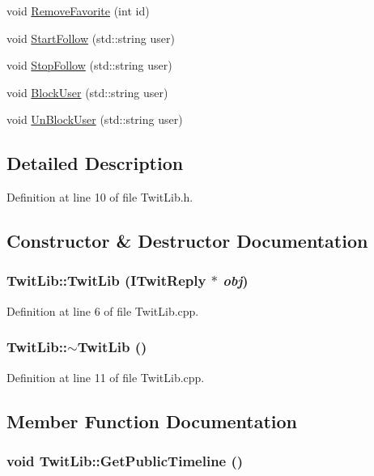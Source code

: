 \begin{CompactItemize}
\item 
void \hyperlink{classTwitLib_3cfdb83433fe9e5675bac209a6db01c6}{RemoveFavorite} (int id)
\item 
void \hyperlink{classTwitLib_26c78a3d62971f17b9b61fbc413438ba}{StartFollow} (std::string user)
\item 
void \hyperlink{classTwitLib_955be6b8ee764e6348e70a055c07c18d}{StopFollow} (std::string user)
\item 
void \hyperlink{classTwitLib_bc66b89dd482ef5407a045e2f8f4709b}{BlockUser} (std::string user)
\item 
void \hyperlink{classTwitLib_0cc001b0c745187cb871508fe3a2bb37}{UnBlockUser} (std::string user)
\end{CompactItemize}


\subsection{Detailed Description}


Definition at line 10 of file TwitLib.h.

\subsection{Constructor \& Destructor Documentation}
\hypertarget{classTwitLib_bbbd7452359f6cdb3b364f23216a5256}{
\subsubsection{\setlength{\rightskip}{0pt plus 5cm}TwitLib::TwitLib ({\bf ITwitReply} $\ast$ {\em obj})}}
\label{classTwitLib_bbbd7452359f6cdb3b364f23216a5256}




Definition at line 6 of file TwitLib.cpp.\hypertarget{classTwitLib_1b5fbc092b2e41432542b8257c04f1d9}{
\subsubsection{\setlength{\rightskip}{0pt plus 5cm}TwitLib::$\sim$TwitLib ()}}
\label{classTwitLib_1b5fbc092b2e41432542b8257c04f1d9}




Definition at line 11 of file TwitLib.cpp.

\subsection{Member Function Documentation}
\hypertarget{classTwitLib_ec4707513fbaa1017cff3ae803900aaf}{
\subsubsection{\setlength{\rightskip}{0pt plus 5cm}void TwitLib::GetPublicTimeline ()}}
\label{classTwitLib_ec4707513fbaa1017cff3ae803900aaf}


